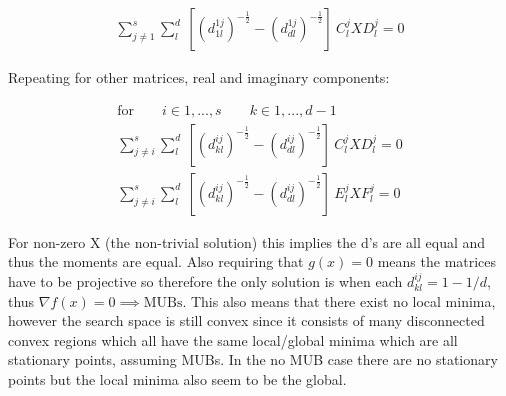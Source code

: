 \documentclass{article}
\begin{document}
\begin{align}
	\sum_{j\ne 1}^s \sum_{l}^d ~ [ (d_{1l}^{1j})^{-\frac{1}{2}} - (d_{dl}^{1j})^{-\frac{1}{2}}] ~ C_l^j X D_l^j = 0
\end{align}

Repeating for other matrices, real and imaginary components:

\begin{align}
	\text{for} \qquad i \in {1,...,s} \qquad k \in {1,...,d-1} \\
	\sum_{j\ne i}^s \sum_{l}^d ~ [ (d_{kl}^{ij})^{-\frac{1}{2}} - (d_{dl}^{ij})^{-\frac{1}{2}}] ~ C_l^j X D_l^j = 0 \\
	\sum_{j\ne i}^s \sum_{l}^d ~ [ (d_{kl}^{ij})^{-\frac{1}{2}} - (d_{dl}^{ij})^{-\frac{1}{2}}] ~ E_l^j X F_l^j = 0
\end{align}

For non-zero X (the non-trivial solution) this implies the d's are all equal and thus the moments are equal. Also requiring that $g(x) = 0$ means the matrices have to be projective so therefore the only solution is when each $d_{kl}^{ij} = 1-1/d$, thus $\nabla f(x) = 0 \implies \text{MUBs}$. This also means that there exist no local minima, however the search space is still convex since it consists of many disconnected convex regions which all have the same local/global minima which are all stationary points, assuming MUBs. In the no MUB case there are no stationary points but the local minima also seem to be the global.
\end{document}
